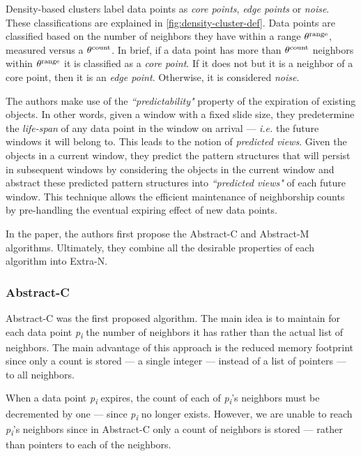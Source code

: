 Density-based clusters label data points as \textit{core points}, \textit{edge points} or \textit{noise}. These classifications are explained in \ref{fig:density-cluster-def}. Data points are classified based on the number of neighbors they have within a range $\theta\textsuperscript{range}$, measured versus a $\theta\textsuperscript{count}$. In brief, if a data point has more than $\theta\textsuperscript{count}$ neighbors within $\theta\textsuperscript{range}$ it is classified as a \textit{core point}. If it does not but it is a neighbor of a core point, then it is an \textit{edge point}. Otherwise, it is considered \textit{noise}. 

The authors make use of the \textit{“predictability"} property of the expiration of existing objects. In other words, given a window with a fixed slide size, they predetermine the \textit{life-span} of any data point in the window on arrival --- \textit{i.e.} the future windows it will belong to. This leads to the notion of \textit{predicted views}. Given the objects in a current window, they predict the pattern structures that will persist in subsequent windows by considering the objects in the current window and abstract these predicted pattern structures into \textit{“predicted views"} of each future window. This technique allows the efficient maintenance of neighborship counts by pre-handling the eventual expiring effect of new data points.

In the paper, the authors first propose the Abstract-C and Abstract-M algorithms. Ultimately, they combine all the desirable properties of each algorithm into Extra-N. 

\subsubsection{Abstract-C}
Abstract-C was the first proposed algorithm. The main idea is to maintain for each data point \textit{p\textsubscript{i}} the number of neighbors it has rather than the actual list of neighbors. The main advantage of this approach is the reduced memory footprint since only a count is stored --- a single integer --- instead of a list of pointers --- to all neighbors.

When a data point \textit{p\textsubscript{i}} expires, the count of each of \textit{p\textsubscript{i}}'s neighbors must be decremented by one --- since \textit{p\textsubscript{i}} no longer exists. However, we are unable to reach \textit{p\textsubscript{i}}'s neighbors since in Abstract-C only a count of neighbors is stored --- rather than pointers to each of the neighbors.

